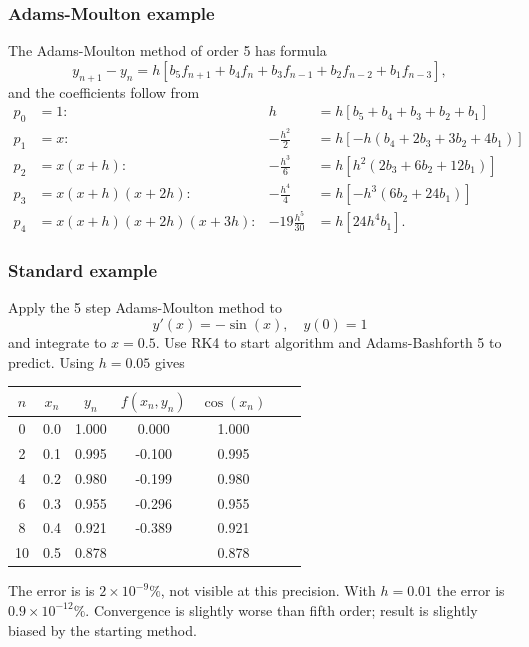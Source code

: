 \documentclass{beamer}
\begin{document}
\begin{frame}
  \frametitle{Adams-Moulton example}

  The Adams-Moulton method of order 5 has formula
  \begin{equation*}
    y_{n+1} - y_n = h \left[ b_5 f_{n+1} + b_4 f_{n} + b_3 f_{n-1} +
      b_2 f_{n-2} + b_1 f_{n-3} \right],
  \end{equation*} \pause
  and the coefficients follow from
  {\small
  \begin{align*}
    p_0 & = 1: & h & = h \left[ b_5 + b_4 + b_3 + b_2 + b_1 \right] \\
    p_1 & = x: & -\frac{h^2}{2} & = h \left[ -h \left( b_4 + 2 b_3 + 3
        b_2 + 4 b_1 \right) \right] \\
    p_2 & = x (x + h): & -\frac{h^3}{6} & = h \left[ h^2 \left( 2 b_3
        + 6 b_2 + 12 b_1 \right) \right] \\
    p_3 & = x (x + h) (x + 2 h): & -\frac{h^4}{4} & = h \left[ -h^3
      \left( 6 b_2 + 24 b_1 \right) \right] \\
    p_4 & = x (x + h) (x + 2 h) (x + 3 h): & -19 \frac{h^5}{30} & = h
    \left[ 24 h^4 b_1 \right].
  \end{align*}
  }
\end{frame}


\begin{frame}
  \frametitle{Standard example}

  Apply the 5 step Adams-Moulton method to
  \begin{equation*}
    y'(x) = - \sin(x), \quad y(0) = 1
  \end{equation*}
  and integrate to $x = 0.5$. Use RK4 to start algorithm and
  Adams-Bashforth 5 to predict. Using $h = 0.05$ gives
  \begin{center}
    \begin{tabular}{c|c c c c c c}
      $n$ & $x_n$ & $y_n$ & $f(x_n, y_n)$ & $\cos(x_n)$ \\
      \hline
      0 & 0.0 & 1.000 &  0.000 & 1.000 \\
      2 & 0.1 & 0.995 & -0.100 & 0.995 \\
      4 & 0.2 & 0.980 & -0.199 & 0.980 \\
      6 & 0.3 & 0.955 & -0.296 & 0.955 \\
      8 & 0.4 & 0.921 & -0.389 & 0.921 \\
      10 & 0.5 & 0.878 &        & 0.878
    \end{tabular}
  \end{center} \pause
  The error is is $2 \times 10^{-9}\%$, not visible at this precision.
  With $h = 0.01$ the error is $0.9 \times 10^{-12}\%$.  Convergence
  is slightly worse than fifth order; result is slightly biased by the
  starting method.

\end{frame}
\end{document}
